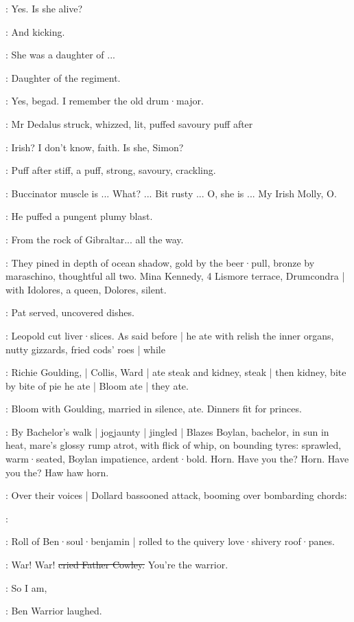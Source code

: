 \dollard:
Yes.
Is she alive?

\simon:
And kicking.

\dollard:
She was a daughter of ...

\simon:
Daughter of the regiment.

\dollard:
Yes,
begad.
I remember the old drum·major.

:
Mr Dedalus struck,
whizzed,
lit,
puffed savoury puff after

\dollard:
Irish?
I don't know,
faith.
Is she,
Simon?

:
Puff after stiff,
a puff,
strong,
savoury,
crackling.

\simon:
Buccinator muscle is ...
What?
...
Bit rusty ...
O,
she is ...
My Irish Molly,
O.

:
He puffed a pungent plumy blast.

\simon:
From the rock of Gibraltar...
all the way.

:
They pined in depth of ocean shadow,
gold by the beer·pull,
bronze by ma\-ra\-schi\-no,
thoughtful all two.
Mina Kennedy,
4 Lismore terrace,
Drumcondra |
with Idolores,
a queen,
Dolores,
silent.

:
Pat served,
uncovered dishes.

:
Leopold cut liver·slices.
As said before |
he ate with relish the inner organs,
nutty gizzards,
fried cods' roes |
while

:
Richie Goulding, |
Collis, Ward |
ate steak and kidney,
steak |
then kidney,
bite by bite of pie he ate |
Bloom ate |
they ate.

:
Bloom with Goulding,
married in silence,
ate.
Dinners fit for princes.

:
By Bachelor's walk |
jogjaunty |
jingled |
Blazes Boylan,
bachelor,
in sun
in heat,
mare's glossy rump atrot,
with flick of whip,
on bounding tyres:
sprawled,
warm·seated,
Boylan impatience,
ardent·bold.
Horn.
Have you the?
Horn.
Have you the?
Haw haw horn.

:
Over their voices |
Dollard bassooned attack,
booming over bombarding chords:

\dollard:

:
Roll of Ben·soul·benjamin |
rolled to the quivery love·shivery roof·panes.

\cowley:
War!
War!
\sout{cried Father Cowley.}
You're the warrior.

\dollard:
So I am,

:
Ben Warrior laughed.

